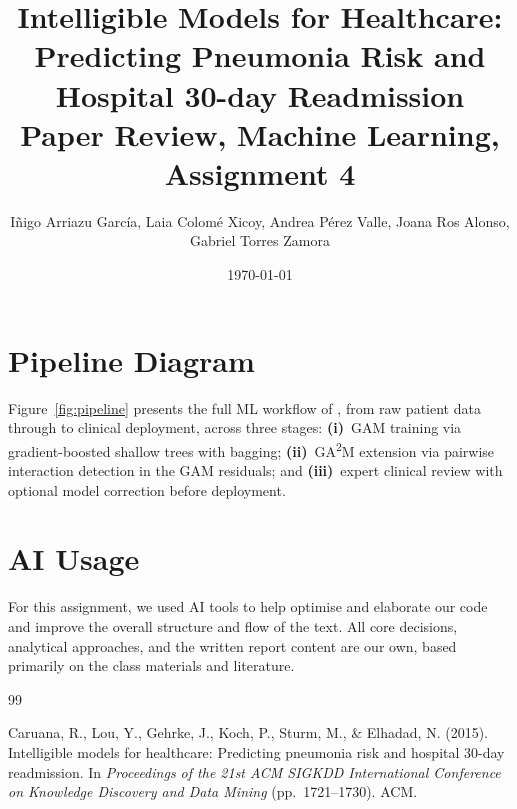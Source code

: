 \documentclass[twocolumn, fontsize=10pt]{article}
\title{%
  \Large\centering
  \textbf{Intelligible Models for Healthcare: Predicting Pneumonia Risk
          and Hospital 30-day Readmission}\\[6pt]
  \large\textcolor{RCharcoal}{Paper Review, Machine Learning, Assignment 4}\\[10pt]}
\date{\today}
\author{{\normalsize
  Iñigo Arriazu García, Laia Colomé Xicoy, Andrea Pérez Valle,
  Joana Ros Alonso, Gabriel Torres Zamora}}
\makeatletter
\renewcommand{\maketitle}{\bgroup\setlength{\parindent}{0pt}
\begin{flushleft}\@title\@author\\\@date\end{flushleft}\egroup}
\makeatother
\begin{document}
\twocolumn[\maketitle]

\section{Pipeline Diagram}
\label{sec:pipeline}

Figure~\ref{fig:pipeline} presents the full ML workflow of
\citet{caruana2015intelligible}, from raw patient data through to clinical
deployment, across three stages: \textbf{(i)}~GAM training via
gradient-boosted shallow trees with bagging; \textbf{(ii)}~GA\textsuperscript{2}M
extension via pairwise interaction detection in the GAM residuals; and
\textbf{(iii)}~expert clinical review with optional model correction before
deployment.


\section*{AI Usage}
For this assignment, we used AI tools to help optimise and elaborate our
code and improve the overall structure and flow of the text. All core
decisions, analytical approaches, and the written report content are our
own, based primarily on the class materials and literature.


\begin{thebibliography}{99}

Caruana, R., Lou, Y., Gehrke, J., Koch, P., Sturm, M., \& Elhadad, N. (2015).
\newblock Intelligible models for healthcare: Predicting pneumonia risk and
  hospital 30-day readmission.
\newblock In \textit{Proceedings of the 21st ACM SIGKDD International
  Conference on Knowledge Discovery and Data Mining} (pp.\ 1721--1730). ACM.

\end{thebibliography}
\end{document}
